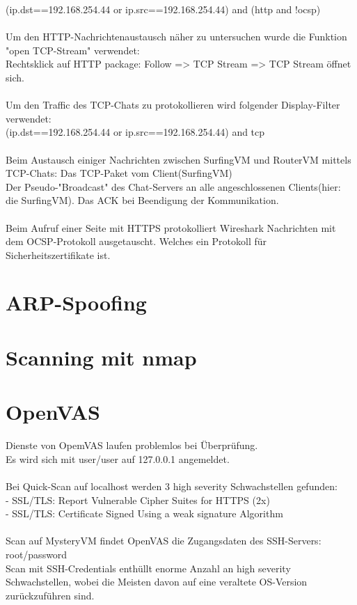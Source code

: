 \documentclass[12pt]{article}
\theoremstyle{plain}
\begin{document}
(ip.dst==192.168.254.44 or ip.src==192.168.254.44) and (http and !ocsp)\\ \\
Um den HTTP-Nachrichtenaustausch näher zu untersuchen wurde die Funktion "open TCP-Stream" verwendet: \\
Rechtsklick auf HTTP package: Follow => TCP Stream => TCP Stream öffnet sich.
\\\\
Um den Traffic des TCP-Chats zu protokollieren wird folgender Display-Filter verwendet: \\
(ip.dst==192.168.254.44 or ip.src==192.168.254.44) and tcp\\\\
Beim Austausch einiger Nachrichten zwischen SurfingVM und RouterVM mittels TCP-Chats:
Das TCP-Paket vom Client(SurfingVM)\\
Der Pseudo-"Broadcast" des Chat-Servers an alle angeschlossenen Clients(hier: die SurfingVM).
Das ACK bei Beendigung der Kommunikation.
\\\\
Beim Aufruf einer Seite mit HTTPS protokolliert Wireshark Nachrichten mit dem OCSP-Protokoll ausgetauscht. Welches ein Protokoll für Sicherheitszertifikate ist.
\section{ARP-Spoofing}
\section{Scanning mit nmap}
\section{OpenVAS}
Dienste von OpemVAS laufen problemlos bei Überprüfung. \\
Es wird sich mit user/user auf 127.0.0.1 angemeldet. \\ \\
Bei Quick-Scan auf localhost werden 3 high severity Schwachstellen gefunden:\\
- SSL/TLS: Report Vulnerable Cipher Suites for HTTPS (2x)\\
- SSL/TLS: Certificate Signed Using a weak signature Algorithm\\\\
Scan auf MysteryVM findet OpenVAS die Zugangsdaten des SSH-Servers: root/password\\
Scan mit SSH-Credentials enthüllt enorme Anzahl an high severity Schwachstellen, wobei die Meisten davon auf eine veraltete OS-Version zurückzuführen sind.
\newline
\end{document}
